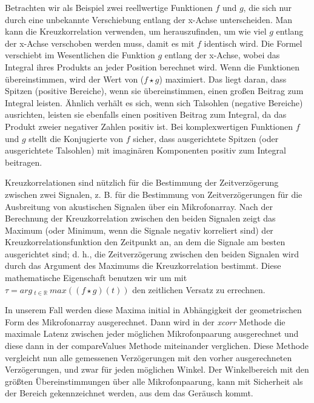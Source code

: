 Betrachten wir als Beispiel zwei reellwertige Funktionen $ f $ und $ g $, die sich nur durch eine unbekannte Verschiebung entlang der x-Achse unterscheiden. Man kann die Kreuzkorrelation verwenden, um herauszufinden, um wie viel $ g $ entlang der x-Achse verschoben werden muss, damit es mit $ f $ identisch wird. Die Formel verschiebt im Wesentlichen die Funktion $ g $ entlang der x-Achse, wobei das Integral ihres Produkts an jeder Position berechnet wird. Wenn die Funktionen übereinstimmen, wird der Wert von ($ f \star g $) maximiert. Das liegt daran, dass Spitzen (positive Bereiche), wenn sie übereinstimmen, einen großen Beitrag zum Integral leisten. Ähnlich verhält es sich, wenn sich Talsohlen (negative Bereiche) ausrichten, leisten sie ebenfalls einen positiven Beitrag zum Integral, da das Produkt zweier negativer Zahlen positiv ist. Bei komplexwertigen Funktionen $ f $ und $ g $ stellt die Konjugierte von $ f $ sicher, dass ausgerichtete Spitzen (oder ausgerichtete Talsohlen) mit imaginären Komponenten positiv zum Integral beitragen.

Kreuzkorrelationen sind nützlich für die Bestimmung der Zeitverzögerung zwischen zwei Signalen, z. B. für die Bestimmung von Zeitverzögerungen für die Ausbreitung von akustischen Signalen über ein Mikrofonarray. Nach der Berechnung der Kreuzkorrelation zwischen den beiden Signalen zeigt das Maximum (oder Minimum, wenn die Signale negativ korreliert sind) der Kreuzkorrelationsfunktion den Zeitpunkt an, an dem die Signale am besten ausgerichtet sind; d. h., die Zeitverzögerung zwischen den beiden Signalen wird durch das Argument des Maximums die Kreuzkorrelation bestimmt. Diese mathematische Eigenschaft benutzen wir um mit
$ \tau= arg\ _{t \in \mathbb{R}}\ max\left(( f \star g)(t)\right) $ den zeitlichen Versatz zu errechnen.

In unserem Fall werden diese Maxima initial in Abhängigkeit der geometrischen Form des Mikrofonarray ausgerechnet. Dann wird in der \textit{xcorr} Methode die maximale Latenz zwischen jeder möglichen Mikrofonpaarung ausgerechnet und diese dann in der compareValues Methode miteinander verglichen. Diese Methode vergleicht nun alle gemessenen Verzögerungen mit den vorher ausgerechneten Verzögerungen, und zwar für jeden möglichen Winkel. Der Winkelbereich mit den größten Übereinstimmungen über alle Mikrofonpaarung, kann mit Sicherheit als der Bereich gekennzeichnet werden, aus dem das Geräusch kommt.

\newpage